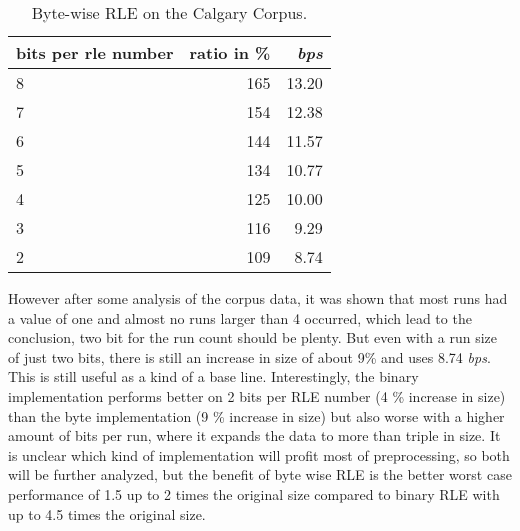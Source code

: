 \begin{table}[h]
	\centering
	\begin{tabular}{l|r|r}
		bits per rle number &  ratio in \% & \textit{bps}\\
		\hline
		8 & 165 & 13.20 \\
		7 & 154 & 12.38\\
		6 & 144 & 11.57 \\
		5 & 134 & 10.77\\
		4 & 125 & 10.00\\
		3 & 116 & 9.29\\
		2 & 109 & 8.74 \\
	\end{tabular}
	\caption{Byte-wise RLE on the Calgary Corpus.}
	\label{tab:t31 Byte-wise RLE on the Calgary Corpus}
\end{table}


\par{
 However after some analysis of the corpus data, it was shown that most runs had a value of one and almost no runs larger than 4 occurred, which lead to the conclusion, two bit for the run count should be plenty. But even with a run size of just two bits, there is still an increase in size of about 9\% and uses 8.74 \textit{bps}. This is still useful as a kind of a base line. Interestingly, the binary implementation performs better on 2 bits per RLE number (4 \% increase in size) than the byte implementation (9 \% increase in size) but also worse with a higher amount of bits per run, where it expands the data to more than triple in size. It is unclear which kind of implementation will profit most of preprocessing, so both will be further analyzed, but the benefit of byte wise RLE is the better worst case performance of 1.5 up to 2 times the original size compared to binary RLE with up to 4.5 times the original size.
}

